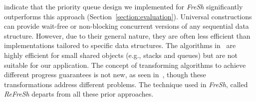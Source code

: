 \documentclass[a4paper,11pt,twoside,openany]{book}
\begin{document}
indicate that the priority queue design we implemented for \textit{FreSh} significantly
outperforms this approach (Section~\ref{section:evaluation}).
% 
Universal constructions~\cite{FK11spaa, FK12ppopp, FK14, FK17opodis, FK09, FK20,
FKK18, EF+16, FKK22} can provide wait-free or non-blocking concurrent versions of any
sequential data structure. However, due to their general nature, they are often less
efficient than implementations tailored to specific data structures. The algorithms
in~\cite{FK11spaa, FK14, FKK22} are highly efficient for small shared objects
(e.g., stacks and queues) but are not suitable for our application.
% 
The concept of transforming algorithms to achieve different progress guarantees is not
new, as seen in~\cite{SP14, ELM05, GKK06}, though these transformations address different
problems. The technique used in \textit{FreSh}, called \textit{ReFreSh}  departs from all these
prior approaches.
\end{document}

